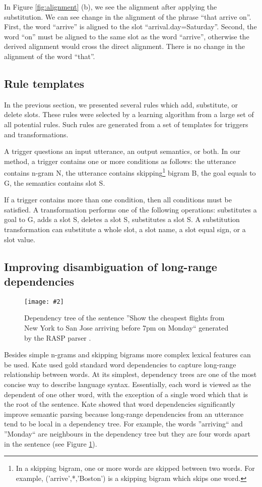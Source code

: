 \documentclass{article}
\newcommand{\citep}[1]{\cite{#1}}
\newcommand{\fgrparam}[4]{
  \begin{figure}[htbp]
    \begin{center}
      \leavevmode
      \texttt{[image: \#2]}
    \end{center}
    \vspace{-0.5cm}
    \caption{#4}
    \label{#3}
  \end{figure}
}
\begin{document}
In Figure \ref{fig:alignment} (b), we see the alignment after applying the substitution. We can see change in the alignment of the phrase ``that arrive on''. First, the word ``arrive'' is aligned to the slot ``arrival.day=Saturday''. Second, the word ``on'' must be aligned to the same slot as the word ``arrive'', otherwise the derived alignment would cross the direct alignment. There is no change in the alignment of the word ``that''.

\subsection{Rule templates}
In the previous section, we presented several rules which add, substitute, or delete slots. These rules were selected by a learning algorithm from a large set of all potential rules. Such rules are generated from a set of templates for triggers and transformations. 

A trigger 
questions an input utterance, an output semantics, or both. In our method, a trigger contains one or more conditions as follows: the utterance contains n-gram N, the utterance contains skipping\footnote{In a skipping bigram, one or more words are skipped between two words. For example, ('arrive',*,'Boston') is a skipping bigram which skips one word.} bigram B, the goal equals to G, the semantics contains slot S.

If a trigger contains more than one condition, then all conditions must be satisfied. A transformation performs one of the following operations: substitutes a goal to G, adds a slot S, deletes a slot S, substitutes a slot S. A substitution transformation can substitute a whole slot, a slot name, a slot equal sign, or a slot value.

\subsection{Improving disambiguation of long-range dependencies}
\label{sec:dep:trees}

\fgrparam{width=5.5cm}{./fig/dep-tree.pdf}{fig:dep:tree}{Dependency tree of the sentence ''Show the cheapest flights from New York to San Jose arriving before 7pm on Monday`` generated by the RASP parser \cite{rasp06}.}

Besides simple n-grams and skipping bigrams more complex lexical features can be used. Kate \citep{kate08} used gold standard word dependencies to capture long-range relationship between words. At its simplest, dependency trees are one of the most concise way to describe language syntax. Essentially, each word is viewed as the dependent of one other word, with the exception of a single word which that is the root of the sentence. Kate showed that word dependencies significantly improve semantic parsing because long-range dependencies from an utterance tend to be local in a dependency tree. For example, the words ''arriving`` and ''Monday`` are neighbours in the dependency tree but they are four words apart in the sentence (see Figure \ref{fig:dep:tree}).
\end{document}
